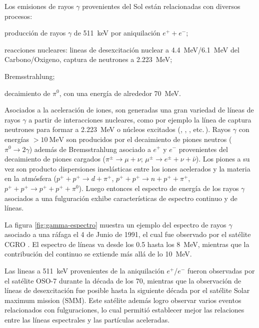 Los emisiones de rayos $\gamma$ provenientes del Sol están relacionadas con diversos procesos:
\begin{enumerate*}
  \item producción de rayos $\gamma$ de \SI{511}{\kilo\electronvolt} por aniquilación $e^{+}+e^{-}$;
  \item reacciones nucleares: lineas de desexcitación nuclear a \SI{4.4}{\mega\electronvolt}/\SI{6.1}{\mega\electronvolt} del Carbono/Oxigeno, captura de neutrones a \SI{2.223}{\mega\electronvolt};
  \item Bremsstrahlung;
  \item decaimiento de $\pi^{0}$, con una energía de alrededor \SI{70}{\mega\electronvolt}.
\end{enumerate*}

Asociados a la aceleración de iones, son generadas una gran variedad de líneas de rayos $\gamma$ a partir de interacciones nucleares, como por ejemplo la línea de captura neutrones para formar  a  \SI{2.223}{\mega\electronvolt} o núcleos excitados (, , , etc.\,). Rayos $\gamma$ con energías $>\SI{10}{\mega\electronvolt}$ son producidos por el decaimiento de piones neutros ($\pi^{0}\rightarrow 2\gamma$) además de Bremsstrahlung asociado a $e^{+}$ y $e^{-}$ provenientes del decaimiento de piones cargados ($\pi^{\pm}\rightarrow\mu+\nu$; $\mu^{\pm}\rightarrow e^{\pm}+\nu+\bar{\nu}$). Los piones a su vez son producto dispersiones ineslásticas entre los iones acelerados y la materia en la atmósfera ($p^{+}+p^{+}\rightarrow d+\pi^{+}$, $p^{+}+p^{+}\rightarrow n+p^{+}+\pi^{+}$, $p^{+}+p^{+}\rightarrow p^{+}+p^{+}+\pi^{0}$). Luego entonces el espectro de energía de los rayos $\gamma$ asociados a una fulguración exhibe características de espectro continuo y de líneas.

La figura \ref{fig:gamma-espectro} muestra un ejemplo del espectro de rayos $\gamma$ asociado a una ráfaga el \num{4} de Junio de \num{1991}, el cual fue observado por el satélite CGRO \cite{murphy94}. El espectro de líneas va desde los \num{0.5} hasta los \SI{8}{\mega\electronvolt}, mientras que la contribución del continuo se extiende más allá de lo \SI{10}{\mega\electronvolt}.

Las lineas a \SI{511}{\kilo\electronvolt} provenientes de la aniquilación $e^{+}$/$e^{-}$ fueron observadas por el satélite OSO-7 durante la década de los \num{70}, mientras que la observación de líneas de desexcitación fue posible hasta la siguiente década por el satélite Solar maximum mission (SMM). Este satélite además logro observar varios eventos relacionados con fulguraciones, lo cual permitió establecer mejor las relaciones entre las líneas espectrales y las partículas aceleradas.

